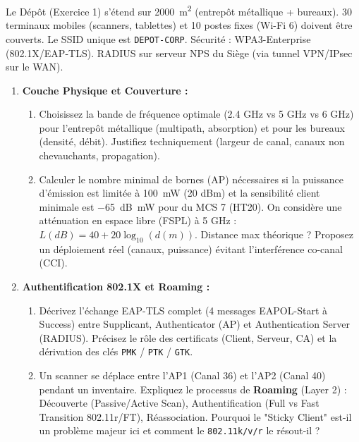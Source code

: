 \documentclass[11pt]{article}
\begin{document}
\begin{exercice}
Le Dépôt (Exercice 1) s'étend sur \SI{2000}{\square\meter} (entrepôt métallique + bureaux). 30 terminaux mobiles (scanners, tablettes) et 10 postes fixes (Wi-Fi 6) doivent être couverts. Le SSID unique est \texttt{DEPOT-CORP}. Sécurité : WPA3-Enterprise (802.1X/EAP-TLS). RADIUS sur serveur NPS du Siège (via tunnel VPN/IPsec sur le WAN).

\begin{enumerate}
    \item \textbf{Couche Physique et Couverture :} 
    \begin{enumerate}
        \item Choisissez la bande de fréquence optimale (2.4 GHz vs 5 GHz vs 6 GHz) pour l'entrepôt métallique (multipath, absorption) et pour les bureaux (densité, débit). Justifiez techniquement (largeur de canal, canaux non chevauchants, propagation).
        \item Calculer le nombre minimal de bornes (AP) nécessaires si la puissance d'émission est limitée à \SI{100}{\milli\watt} (20 dBm) et la sensibilité client minimale est \SI{-65}{\deci\bel\milli\watt} pour du MCS 7 (HT20). On considère une atténuation en espace libre (FSPL) à 5 GHz : $L(dB) = 40 + 20\log_{10}(d(m))$. Distance max théorique ? Proposez un déploiement réel (canaux, puissance) évitant l'interférence co-canal (CCI).
    \end{enumerate}

    \item \textbf{Authentification 802.1X et Roaming :} 
    \begin{enumerate}
        \item Décrivez l'échange EAP-TLS complet (4 messages EAPOL-Start à Success) entre Supplicant, Authenticator (AP) et Authentication Server (RADIUS). Précisez le rôle des certificats (Client, Serveur, CA) et la dérivation des clés \texttt{PMK} / \texttt{PTK} / \texttt{GTK}.
        \item Un scanner se déplace entre l'AP1 (Canal 36) et l'AP2 (Canal 40) pendant un inventaire. Expliquez le processus de \textbf{Roaming} (Layer 2) : Découverte (Passive/Active Scan), Authentification (Full vs Fast Transition 802.11r/FT), Réassociation. Pourquoi le "Sticky Client" est-il un problème majeur ici et comment le \texttt{802.11k/v/r} le résout-il ?
    \end{enumerate}


\end{enumerate}
\end{exercice}
\end{document}
